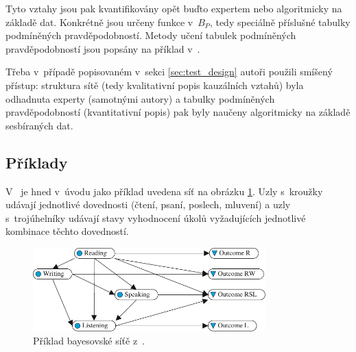 \documentclass[a4paper,twoside,12pt]{scrbook}
\begin{document}
Tyto vztahy jsou pak kvantifikovány opět buďto expertem nebo algoritmicky na základě dat. Konkrétně jsou určeny funkce v~$B_P$, tedy speciálně příslušné tabulky podmíněných pravděpodobností. Metody učení tabulek podmíněných pravděpodobností jsou popsány na příklad v~\cite[kapitola~9]{almond_tlustospis}.

Třeba v~případě popisovaném v~sekci \ref{sec:test_design} autoři použili smíšený přístup: struktura sítě (tedy kvalitativní popis kauzálních vztahů) byla odhadnuta experty (samotnými autory) a tabulky podmíněných pravděpodobností (kvantitativní popis) pak byly naučeny algoritmicky na základě sesbíraných dat.



\subsection{Příklady}
\label{sec:net_examples}
V~\cite{almond_tlustospis} je hned v~úvodu jako příklad uvedena síť na obrázku \ref{fig:almond_BN_example}. Uzly s~kroužky udávají jednotlivé dovednosti (čtení, psaní, poslech, mluvení) a uzly s~trojúhelníky udávají stavy vyhodnocení úkolů vyžadujících jednotlivé kombinace těchto dovedností.

\begin{figure}
  \centering
    \includegraphics[width=0.8\textwidth]{almond_BN_example.pdf}
  \caption{Příklad bayesovské síťě z~\cite{almond_tlustospis}.}
  \label{fig:almond_BN_example}
\end{figure}
\end{document}
